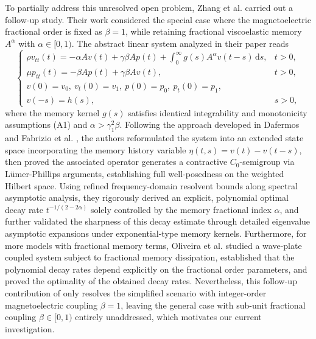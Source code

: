 \documentclass[12pt,reqno]{article}
\begin{document}
To partially address this unresolved open problem, Zhang et al. \cite{MR4939108} carried out a follow-up study. Their work considered the special case where the magnetoelectric fractional order is fixed as $\beta=1$, while retaining fractional viscoelastic memory $A^\alpha$ with $\alpha\in[0,1)$. The abstract linear system analyzed in their paper reads
\begin{equation}\label{ESAIM-model}
\begin{cases}
\rho v_{tt}(t)=-\alpha Av(t)+\gamma\beta Ap(t)+\displaystyle\int_{0}^{\infty}g(s)A^\alpha v(t-s)\,\mathrm{d}s, & t>0,\\
\mu p_{tt}(t)=-\beta Ap(t)+\gamma\beta Av(t), & t>0,\\
v(0)=v_0,\ v_t(0)=v_1,\ p(0)=p_0,\ p_t(0)=p_1,\\
v(-s)=h(s), & s>0,
\end{cases}
\end{equation}
where the memory kernel $g(s)$ satisfies identical integrability and monotonicity assumptions (A1) and $\alpha>\gamma_1^2\beta$. Following the approach developed in Dafermos \cite{Dafermos1970} and Fabrizio et al. \cite{MR2679371}, the authors reformulated the system into an extended state space incorporating the memory history variable $\eta(t,s)=v(t)-v(t-s)$, then proved the associated operator generates a contractive $C_0$-semigroup via L\"umer-Phillips arguments, establishing full well-posedness on the weighted Hilbert space. Using refined frequency-domain resolvent bounds along spectral asymptotic analysis, they rigorously derived an explicit, polynomial optimal decay rate $t^{-1/(2-2\alpha)}$ solely controlled by the memory fractional index $\alpha$, and further validated the sharpness of this decay estimate through detailed eigenvalue asymptotic expansions under exponential-type memory kernels. Furthermore, for more models with fractional memory terms, Oliveira et al. \cite{MR4663194,MR4991955} studied a wave-plate coupled system subject to fractional memory dissipation, established that the polynomial decay rates depend explicitly on the fractional order parameters, and proved the optimality of the obtained decay rates. Nevertheless, this follow-up contribution of \cite{MR4939108} only resolves the simplified scenario with integer-order magnetoelectric coupling $\beta=1$, leaving the general case with sub-unit fractional coupling $\beta\in[0,1)$ entirely unaddressed, which motivates our current investigation.
\end{document}
